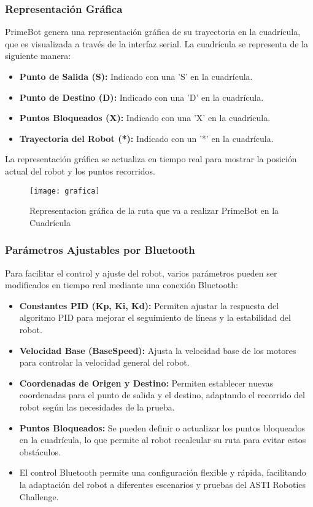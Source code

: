 \subsubsection{Representación Gráfica}
PrimeBot genera una representación gráfica de su trayectoria en la cuadrícula, que es visualizada a través de la interfaz serial. La cuadrícula se representa de la siguiente manera:
\begin{itemize}
	\item \textbf{Punto de Salida (S):} Indicado con una 'S' en la cuadrícula.
	\item \textbf{Punto de Destino (D):} Indicado con una 'D' en la cuadrícula.
	\item \textbf{Puntos Bloqueados (X):} Indicado con una 'X' en la cuadrícula.
	\item \textbf{Trayectoria del Robot (*):} Indicado con un '*' en la cuadrícula.
\end{itemize}
La representación gráfica se actualiza en tiempo real para mostrar la posición actual del robot y los puntos recorridos.

\begin{figure}[h]
	\centering
	\texttt{[image: grafica]}
	\caption{Representacion gráfica de la ruta que va a realizar PrimeBot en la Cuadrícula}
	\label{fig:3.12}
\end{figure}

\subsubsection{Parámetros Ajustables por Bluetooth}
Para facilitar el control y ajuste del robot, varios parámetros pueden ser modificados en tiempo real mediante una conexión Bluetooth:
\begin{itemize}
	\item \textbf{Constantes PID (Kp, Ki, Kd):} Permiten ajustar la respuesta del algoritmo PID para mejorar el seguimiento de líneas y la estabilidad del robot.
	\item \textbf{Velocidad Base (BaseSpeed):} Ajusta la velocidad base de los motores para controlar la velocidad general del robot.
	\item \textbf{Coordenadas de Origen y Destino:} Permiten establecer nuevas coordenadas para el punto de salida y el destino, adaptando el recorrido del robot según las necesidades de la prueba.
	\item \textbf{Puntos Bloqueados:} Se pueden definir o actualizar los puntos bloqueados en la cuadrícula, lo que permite al robot recalcular su ruta para evitar estos obstáculos.
	\item El control Bluetooth permite una configuración flexible y rápida, facilitando la adaptación del robot a diferentes escenarios y pruebas del ASTI Robotics Challenge.
\end{itemize}


